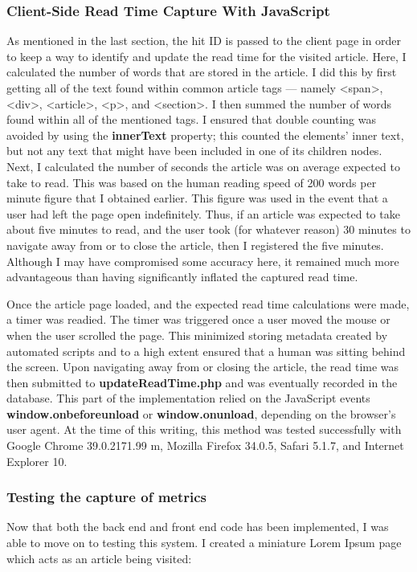 \documentclass[12pt]{article}
\begin{document}
{\subsubsection{Client-Side Read Time Capture With JavaScript} 
As mentioned in the last section, the hit ID is passed to the client page in order to keep a way to identify and update the read time for the visited article. Here, I calculated the number of words that are stored in the article. I did this by first getting all of the text found within common article tags --- namely <span>, <div>, <article>, <p>, and <section>. I then summed the number of words found within all of the mentioned tags. I ensured that double counting was avoided by using the \textbf{innerText} property; this counted the elements' inner text, but not any text that might have been included in one of its children nodes. Next, I calculated the number of seconds the article was on average expected to take to read. This was based on the human reading speed of 200 words per minute figure that I obtained earlier. This figure was used in the event that a user had left the page open indefinitely. Thus, if an article was expected to take about five minutes to read, and the user took (for whatever reason) 30 minutes to navigate away from or to close the article, then I registered the five minutes. Although I may have compromised some accuracy here, it remained much more advantageous than having significantly inflated the captured read time.

Once the article page loaded, and the expected read time calculations were made, a timer was readied. The timer was triggered once a user moved the mouse or when the user scrolled the page. This minimized storing metadata created by automated scripts and to a high extent ensured that a human was sitting behind the screen. Upon navigating away from or closing the article, the read time was then submitted to \textbf{updateReadTime.php} and was eventually recorded in the database. This part of the implementation relied on the JavaScript events \textbf{window.onbeforeunload} or \textbf{window.onunload}, depending on the browser's user agent. At the time of this writing, this method was tested successfully with Google Chrome 39.0.2171.99 m, Mozilla Firefox 34.0.5, Safari 5.1.7, and Internet Explorer 10.
 
\newpage

\subsubsection{Testing the capture of metrics}
Now that both the back end and front end code has been implemented, I was able to move on to testing this system. I created a miniature Lorem Ipsum page which acts as an article being visited: \\

}
\end{document}
